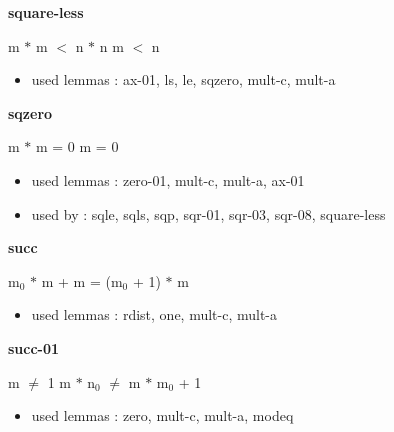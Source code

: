 \documentclass[a4paper]{article}
\begin{document}
\medskip

\bigskip

{\large\bf square-less}

\medskip

 \Fol m $*$ m $<$ n $*$ n \Equiv m $<$ n

\begin{itemize}


\item       used lemmas  : ax-01, ls, le, sqzero, mult-c, mult-a

\end{itemize}

\medskip

\bigskip

{\large\bf sqzero}

\medskip

 \Fol m $*$ m = 0 \Equiv m = 0

\begin{itemize}


\item       used lemmas  : zero-01, mult-c, mult-a, ax-01
\item       used by      : sqle, sqls, sqp, sqr-01, sqr-03, sqr-08, square-less

\end{itemize}

\medskip

\bigskip

{\large\bf succ}

\medskip

 \Fol $\mbox{m}_{0}$ $*$ m + m = ($\mbox{m}_{0}$ + 1) $*$ m

\begin{itemize}


\item       used lemmas  : rdist, one, mult-c, mult-a

\end{itemize}

\medskip

\bigskip

{\large\bf succ-01}

\medskip

 \Fol m $\neq$ 1 \Imp m $*$ $\mbox{n}_{0}$ $\neq$ m $*$ $\mbox{m}_{0}$ + 1

\begin{itemize}


\item       used lemmas  : zero, mult-c, mult-a, modeq

\end{itemize}
\end{document}
